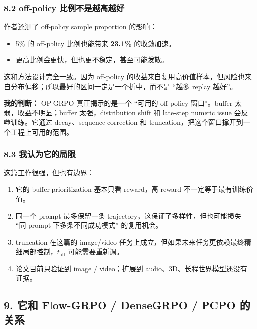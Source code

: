 \subsubsection{8.2 off-policy 比例不是越高越好}

作者还测了 off-policy sample proportion 的影响：

\begin{itemize}[leftmargin=1.5em]
  \item 5\% 的 off-policy 比例也能带来 \textbf{23.1\%} 的收敛加速。
  \item 更高比例会更快，但也更不稳定，甚至可能发散。
\end{itemize}

这和方法设计完全一致。因为 off-policy 的收益来自复用高价值样本，但风险也来自分布偏移；所以最好的区间一定是一个折中，而不是 ``越多 replay 越好''。

\begin{summarybox}
\textbf{我的判断：} OP-GRPO 真正揭示的是一个 ``可用的 off-policy 窗口''。buffer 太弱，收益不明显；buffer 太强，distribution shift 和 late-step numeric issue 会反噬训练。它通过 decay、sequence correction 和 truncation，把这个窗口撑开到一个工程上可用的范围。
\end{summarybox}

\subsubsection{8.3 我认为它的局限}

这篇工作很强，但也有边界：

\begin{enumerate}[leftmargin=1.5em]
  \item 它的 buffer prioritization 基本只看 reward，高 reward 不一定等于最有训练价值。
  \item 同一个 prompt 最多保留一条 trajectory，这保证了多样性，但也可能损失 ``同 prompt 下多条不同成功模式'' 的复用机会。
  \item truncation 在这篇的 image/video 任务上成立，但如果未来任务更依赖最终精细局部控制，\(t_{\mathrm{off}}\) 可能需要重新调。
  \item 论文目前只验证到 image / video；扩展到 audio、3D、长程世界模型还没有证据。
\end{enumerate}

\subsection{9. 它和 Flow-GRPO / DenseGRPO / PCPO 的关系}

